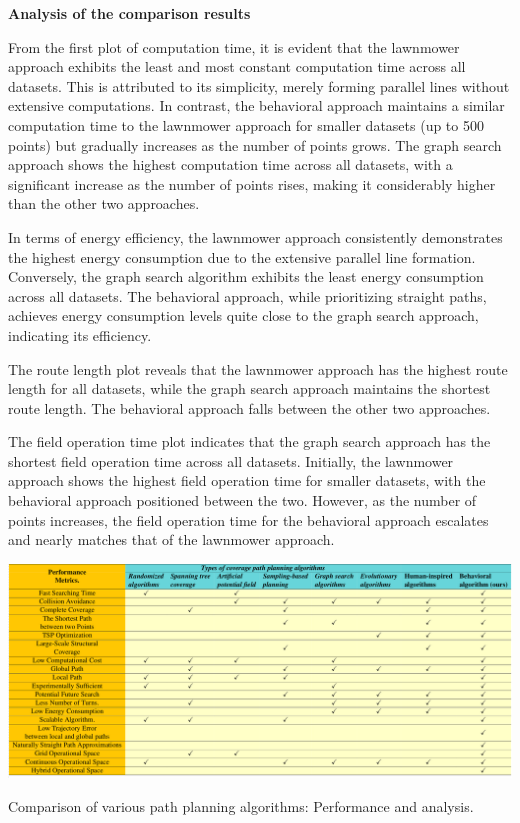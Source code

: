 \textbf{Analysis of the comparison results}  


\vspace{3mm}


From the first plot of computation time, it is evident that the lawnmower approach exhibits the least and most constant computation time across all datasets. This is attributed to its simplicity, merely forming parallel lines without extensive computations. In contrast, the behavioral approach maintains a similar computation time to the lawnmower approach for smaller datasets (up to 500 points) but gradually increases as the number of points grows. The graph search approach shows the highest computation time across all datasets, with a significant increase as the number of points rises, making it considerably higher than the other two approaches.


\vspace{3mm}


In terms of energy efficiency, the lawnmower approach consistently demonstrates the highest energy consumption due to the extensive parallel line formation. Conversely, the graph search algorithm exhibits the least energy consumption across all datasets. The behavioral approach, while prioritizing straight paths, achieves energy consumption levels quite close to the graph search approach, indicating its efficiency.


\vspace{3mm}


The route length plot reveals that the lawnmower approach has the highest route length for all datasets, while the graph search approach maintains the shortest route length. The behavioral approach falls between the other two approaches.


\vspace{3mm}


The field operation time plot indicates that the graph search approach has the shortest field operation time across all datasets. Initially, the lawnmower approach shows the highest field operation time for smaller datasets, with the behavioral approach positioned between the two. However, as the number of points increases, the field operation time for the behavioral approach escalates and nearly matches that of the lawnmower approach. 


\begin{table}[H]
    \centering
    \includegraphics[width=\textwidth]{Images/general/new_tick_table.png}
    \caption{Comparison of various path planning algorithms: Performance and analysis.}
    \label{tab:tick_table}
\end{table}

